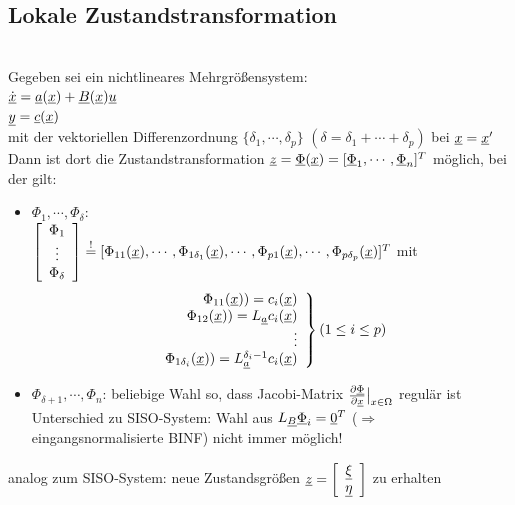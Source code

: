 \documentclass[openany,a4paper,11pt]{book}
\begin{document}
\subsection{Lokale Zustandstransformation}
\\
Gegeben sei ein nichtlineares Mehrgrößensystem:\\ $\uline{\dot{x}}=\uline{a}(\uline{x})+\uline{B}(\uline{x})\uline{u}$\\
$\uline{y}=\uline{c}(\uline{x})$\\
mit der vektoriellen Differenzordnung $\{\delta_1,\cdots,\delta_p\}$ $(\delta=\delta_1+\cdots+\delta_p)$ bei $\uline{x}=\uline{x}'$\\
Dann ist dort die Zustandstransformation $\uline{z}=\uline{\Phi}(\uline{x})=[\uline{\Phi}_1,\cdots,\uline{\Phi}_n]^T$ möglich, bei der gilt:\begin{itemize}
    \item $\Phi_1,\cdots,\Phi_{\delta}$: \\
    $\left[ \begin{array}{c} \Phi_1\\ \vdots \\ \Phi_{\delta}\\ \end{array} \right] \stackrel{!}{=}[\Phi_{11}(\uline{x}),\cdots, \Phi_{1\delta_1}(\uline{x}),\cdots,\Phi_{p1}(\uline{x}),\cdots,\Phi_{p\delta_p}(\uline{x})]^T$ mit\\
    \[\left.
    \begin{array}{r}
    \Phi_{11}(\uline{x}))=c_i(\uline{x})\\
    \Phi_{12}(\uline{x}))=L_{\uline{a}}c_i(\uline{x})\\
    \vdots\\
    \Phi_{1\delta_i}(\uline{x}))=L_{\uline{a}}^{\delta_i-1}c_i(\uline{x})\\
    \end{array}
    \right\} (1\le i\le p)\]
    \item $\Phi_{\delta+1},\cdots,\Phi_n$: beliebige Wahl so, dass Jacobi-Matrix $\frac{\partial \uline{\Phi}}{\partial \uline{x}}\big|_{x\in \Omega}$ regulär ist\\
    Unterschied zu SISO-System: Wahl aus $L_{\uline{B}}\uline{\Phi}_i=\uline{0}^T$ ($\Rightarrow$ eingangsnormalisierte BINF) nicht immer möglich!
\end{itemize}
analog zum SISO-System: neue Zustandsgrößen $\uline{z}=\left[ \begin{array}{c} \uline{\xi}\\\uline{\eta}\\ \end{array} \right]$ zu erhalten 
\end{document}
